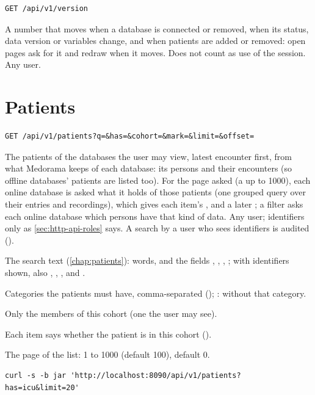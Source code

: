 \begin{lstlisting}[style=signature]
GET /api/v1/version
\end{lstlisting}
A number that moves when a database is connected or removed, when its status, data version or
variables change, and when patients are added or removed: open pages ask for it and redraw when
it moves. Does not count as use of the
session. Any user.

\section{Patients}
\label{sec:http-api-patients}

\begin{lstlisting}[style=signature]
GET /api/v1/patients?q=&has=&cohort=&mark=&limit=&offset=
\end{lstlisting}
The patients of the databases the user may view, latest encounter first, from what Medorama
keeps of each database: its persons and their encounters (so offline databases' patients are
listed too). For the page asked (a  up to 1000), each online database is asked what
it holds of those patients (one grouped query over their entries and recordings), which gives
each item's ,  and a later ; a  filter asks each
online database which persons have that kind of data. Any user; identifiers only as
\cref{sec:http-api-roles} says. A search by a user who sees identifiers is audited
().
\begin{params}
\item[q] The search text (\cref{chap:patients}): words, and the fields ,
  , , ; with identifiers shown, also ,
  , ,  and .
\item[has] Categories the patients must have, comma-separated (); :
  without that category.
\item[cohort] Only the members of this cohort (one the user may see).
\item[mark] Each item says whether the patient is in this cohort ().
\item[limit, offset] The page of the list:  1 to 1000 (default 100),
   default 0.
\end{params}
\begin{lstlisting}[style=shell]
curl -s -b jar 'http://localhost:8090/api/v1/patients?has=icu&limit=20'
\end{lstlisting}

